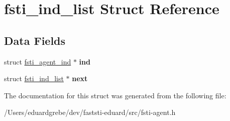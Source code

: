 \hypertarget{structfsti__ind__list}{}\section{fsti\+\_\+ind\+\_\+list Struct Reference}
\label{structfsti__ind__list}
\subsection*{Data Fields}
\begin{DoxyCompactItemize}
\item 
\mbox{\label{structfsti__ind__list_a0eecb3b3d6ceef9b204fd869ec33e35b}} 
struct \mbox{\hyperlink{structfsti__agent__ind}{fsti\+\_\+agent\+\_\+ind}} $\ast$ {\bfseries ind}
\item 
\mbox{\label{structfsti__ind__list_a98e94b5030efc261759e3e39660bedca}} 
struct \mbox{\hyperlink{structfsti__ind__list}{fsti\+\_\+ind\+\_\+list}} $\ast$ {\bfseries next}
\end{DoxyCompactItemize}


The documentation for this struct was generated from the following file\+:\begin{DoxyCompactItemize}
\item 
/\+Users/eduardgrebe/dev/faststi-\/eduard/src/fsti-\/agent.\+h\end{DoxyCompactItemize}

